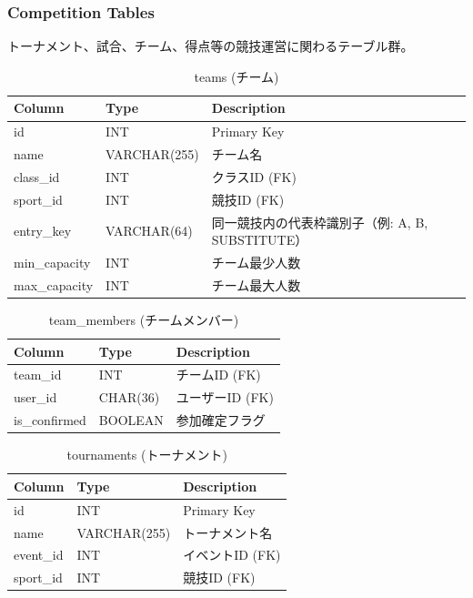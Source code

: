 \documentclass[paper=a4, fontsize=11pt]{jlreq}
\begin{document}
\subsubsection{Competition Tables}
トーナメント、試合、チーム、得点等の競技運営に関わるテーブル群。

\begin{table}[H]
    \centering
    \caption{teams (チーム)}
    \begin{tabularx}{\textwidth}{|l|l|X|}
        \toprule
        Column & Type & Description \\
        \midrule
        id & INT & Primary Key \\
        name & VARCHAR(255) & チーム名 \\
        class\_id & INT & クラスID (FK) \\
        sport\_id & INT & 競技ID (FK) \\
        entry\_key & VARCHAR(64) & 同一競技内の代表枠識別子（例: A, B, SUBSTITUTE） \\
        min\_capacity & INT & チーム最少人数 \\
        max\_capacity & INT & チーム最大人数 \\
        \bottomrule
    \end{tabularx}
\end{table}

\begin{table}[H]
    \centering
    \caption{team\_members (チームメンバー)}
    \begin{tabularx}{\textwidth}{|l|l|X|}
        \toprule
        Column & Type & Description \\
        \midrule
        team\_id & INT & チームID (FK) \\
        user\_id & CHAR(36) & ユーザーID (FK) \\
        is\_confirmed & BOOLEAN & 参加確定フラグ \\
        \bottomrule
    \end{tabularx}
\end{table}

\begin{table}[H]
    \centering
    \caption{tournaments (トーナメント)}
    \begin{tabularx}{\textwidth}{|l|l|X|}
        \toprule
        Column & Type & Description \\
        \midrule
        id & INT & Primary Key \\
        name & VARCHAR(255) & トーナメント名 \\
        event\_id & INT & イベントID (FK) \\
        sport\_id & INT & 競技ID (FK) \\
        \bottomrule
    \end{tabularx}
\end{table}
\end{document}
